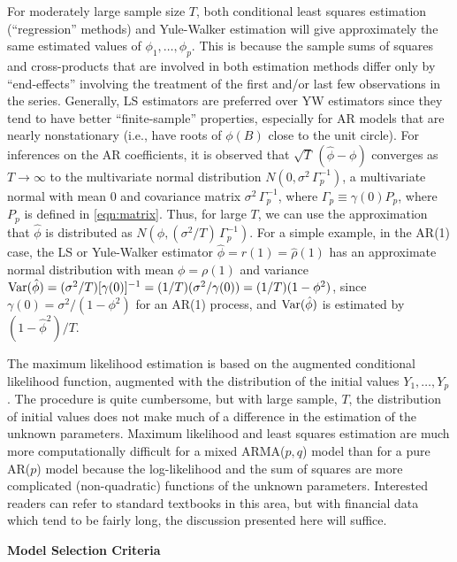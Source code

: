 For moderately large sample size $T$, both conditional least squares estimation (``regression'' methods) and Yule-Walker estimation will give approximately the same estimated values of $\phi_1, \ldots, \phi_p$. This is because the sample sums of squares and cross-products that are involved in both estimation methods differ only by ``end-effects'' involving the treatment of the first and/or last few observations in the series. Generally, LS estimators are preferred over YW estimators since they tend to have better ``finite-sample'' properties, especially for AR models that are nearly nonstationary (i.e., have roots of $\phi(B)$ close to the unit circle). For inferences on the AR coefficients, it is observed that $\sqrt{T}\,(\hat{\phi} - \phi)$ converges as $T \to \infty$ to the multivariate normal distribution $N(0,\sigma^2\,\Gamma_p^{-1})$, a multivariate normal with mean 0 and covariance matrix $\sigma^2\,\Gamma_p^{-1}$, where $\Gamma_p \equiv \gamma(0)P_p$, where $P_p$ is defined in \eqref{eqn:matrix}. Thus, for large $T$, we can use the approximation that $\hat{\phi}$ is distributed as $N(\phi,(\sigma^2/T)\,\Gamma_p^{-1})$. For a simple example, in the AR(1) case, the LS or Yule-Walker estimator $\hat{\phi} = r(1) = \hat{\rho}(1)$ has an approximate normal distribution with mean $\phi = \rho(1)$ and variance $\operatorname{Var}(\hat{\phi}) = (\sigma^2/T)[\gamma(0)]^{-1} = (1/T)(\sigma^2/\gamma(0)) = (1/T)(1 - \phi^2)$, since $\gamma(0) = \sigma^2/(1 - \phi^2)$ for an AR(1) process, and $\operatorname{Var}(\hat{\phi})$ is estimated by $(1 - \hat{\phi}^2)/T$.


The maximum likelihood estimation is based on the augmented conditional likelihood function, augmented with the distribution of the initial values $Y_1, \ldots, Y_p$. The procedure is quite cumbersome, but with large sample, $T$, the distribution of initial values does not make much of a difference in the estimation of the unknown parameters. Maximum likelihood and least squares estimation are much more computationally difficult for a mixed ARMA($p,q$) model than for a pure AR($p$) model because the log-likelihood and the sum of squares are more complicated (non-quadratic) functions of the unknown parameters. Interested readers can refer to standard textbooks in this area, but with financial data which tend to be fairly long, the discussion presented here will suffice. \twomedskip


{\noindent\bfseries\large Model Selection Criteria} \twomedskip


